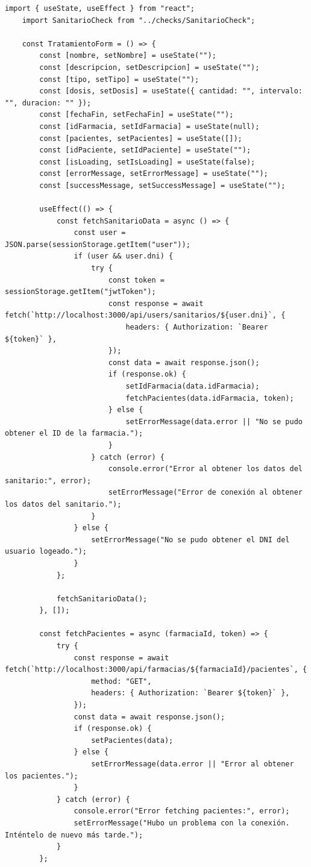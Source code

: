 \begin{lstlisting}[caption={TratamientoForm.jsx - Formulario de creación de tratamiento para un paciente}]
	import { useState, useEffect } from "react";
	import SanitarioCheck from "../checks/SanitarioCheck";
	
	const TratamientoForm = () => {
		const [nombre, setNombre] = useState("");
		const [descripcion, setDescripcion] = useState("");
		const [tipo, setTipo] = useState("");
		const [dosis, setDosis] = useState({ cantidad: "", intervalo: "", duracion: "" });
		const [fechaFin, setFechaFin] = useState("");
		const [idFarmacia, setIdFarmacia] = useState(null);
		const [pacientes, setPacientes] = useState([]);
		const [idPaciente, setIdPaciente] = useState("");
		const [isLoading, setIsLoading] = useState(false);
		const [errorMessage, setErrorMessage] = useState("");
		const [successMessage, setSuccessMessage] = useState("");
		
		useEffect(() => {
			const fetchSanitarioData = async () => {
				const user = JSON.parse(sessionStorage.getItem("user"));
				if (user && user.dni) {
					try {
						const token = sessionStorage.getItem("jwtToken");
						const response = await fetch(`http://localhost:3000/api/users/sanitarios/${user.dni}`, {
							headers: { Authorization: `Bearer ${token}` },
						});
						const data = await response.json();
						if (response.ok) {
							setIdFarmacia(data.idFarmacia);
							fetchPacientes(data.idFarmacia, token);
						} else {
							setErrorMessage(data.error || "No se pudo obtener el ID de la farmacia.");
						}
					} catch (error) {
						console.error("Error al obtener los datos del sanitario:", error);
						setErrorMessage("Error de conexión al obtener los datos del sanitario.");
					}
				} else {
					setErrorMessage("No se pudo obtener el DNI del usuario logeado.");
				}
			};
			
			fetchSanitarioData();
		}, []);
		
		const fetchPacientes = async (farmaciaId, token) => {
			try {
				const response = await fetch(`http://localhost:3000/api/farmacias/${farmaciaId}/pacientes`, {
					method: "GET",
					headers: { Authorization: `Bearer ${token}` },
				});
				const data = await response.json();
				if (response.ok) {
					setPacientes(data);
				} else {
					setErrorMessage(data.error || "Error al obtener los pacientes.");
				}
			} catch (error) {
				console.error("Error fetching pacientes:", error);
				setErrorMessage("Hubo un problema con la conexión. Inténtelo de nuevo más tarde.");
			}
		};
		

\end{lstlisting}
